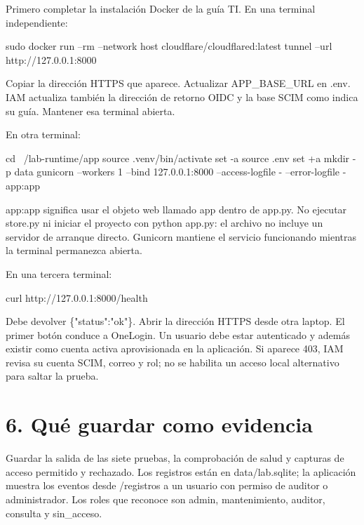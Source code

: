 \documentclass[12pt,a4paper]{article}
\begin{document}
Primero completar la instalación Docker de la guía TI. En una terminal independiente:\par
{}
\begin{Comandos}
sudo docker run --rm --network host cloudflare/cloudflared:latest tunnel --url http://127.0.0.1:8000
\end{Comandos}
Copiar la dirección HTTPS que aparece. Actualizar \textnormal{APP\_\allowbreak{}BASE\_\allowbreak{}URL} en \textnormal{.env}. IAM actualiza también la dirección de retorno OIDC y la base SCIM como indica su guía. Mantener esa terminal abierta.\par
En otra terminal:\par
{}
\begin{Comandos}
cd ~/lab-runtime/app
source .venv/bin/activate
set -a
source .env
set +a
mkdir -p data
gunicorn --workers 1 --bind 127.0.0.1:8000 --access-logfile - --error-logfile - app:app
\end{Comandos}
\textnormal{app:app} significa usar el objeto web llamado \textnormal{app} dentro de \textnormal{app.py}. No ejecutar \textnormal{store.py} ni iniciar el proyecto con \textnormal{python app.py}: el archivo no incluye un servidor de arranque directo. Gunicorn mantiene el servicio funcionando mientras la terminal permanezca abierta.\par
En una tercera terminal:\par
{}
\begin{Comandos}
curl http://127.0.0.1:8000/health
\end{Comandos}
Debe devolver \textnormal{\{"status":"ok"\}}. Abrir la dirección HTTPS desde otra laptop. El primer botón conduce a OneLogin. Un usuario debe estar autenticado y además existir como cuenta activa aprovisionada en la aplicación. Si aparece 403, IAM revisa su cuenta SCIM, correo y rol; no se habilita un acceso local alternativo para saltar la prueba.\par
{}\section*{6. Qué guardar como evidencia}
Guardar la salida de las siete pruebas, la comprobación de salud y capturas de acceso permitido y rechazado. Los registros están en \textnormal{data/\allowbreak{}lab.sqlite}; la aplicación muestra los eventos desde \textnormal{/\allowbreak{}registros} a un usuario con permiso de auditor o administrador. Los roles que reconoce son \textnormal{admin}, \textnormal{mantenimiento}, \textnormal{auditor}, \textnormal{consulta} y \textnormal{sin\_\allowbreak{}acceso}.\par
\end{document}
